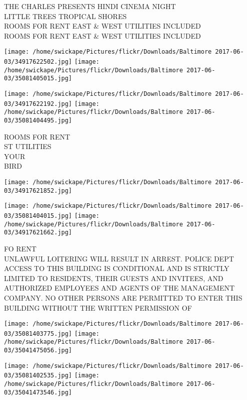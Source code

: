 \documentclass[10pt,letterpaper]{article}
\begin{document}
THE CHARLES PRESENTS HINDI CINEMA NIGHT\\
LITTLE TREES TROPICAL SHORES\\
ROOMS FOR RENT EAST \& WEST UTILITIES INCLUDED\\
ROOMS FOR RENT EAST \& WEST UTILITIES INCLUDED\\
\pagebreak

\texttt{[image: /home/swickape/Pictures/flickr/Downloads/Baltimore 2017-06-03/34917622502.jpg]}
\texttt{[image: /home/swickape/Pictures/flickr/Downloads/Baltimore 2017-06-03/35081405015.jpg]}

\texttt{[image: /home/swickape/Pictures/flickr/Downloads/Baltimore 2017-06-03/34917622192.jpg]}
\texttt{[image: /home/swickape/Pictures/flickr/Downloads/Baltimore 2017-06-03/35081404495.jpg]}

ROOMS FOR RENT\\
ST UTILITIES\\
YOUR\\
BIRD\\
\pagebreak

\texttt{[image: /home/swickape/Pictures/flickr/Downloads/Baltimore 2017-06-03/34917621852.jpg]}

\vspace{0.25in}
\texttt{[image: /home/swickape/Pictures/flickr/Downloads/Baltimore 2017-06-03/35081404015.jpg]}
\texttt{[image: /home/swickape/Pictures/flickr/Downloads/Baltimore 2017-06-03/34917621662.jpg]}

FO RENT\\
UNLAWFUL LOITERING WILL RESULT IN ARREST.  POLICE DEPT\\
ACCESS TO THIS BUILDING IS CONDITIONAL AND IS STRICTLY LIMITED TO RESIDENTS, THEIR GUESTS AND INVITEES, AND AUTHORIZED EMPLOYEES AND AGENTS OF THE MANAGEMENT COMPANY.  NO OTHER PERSONS ARE PERMITTED TO ENTER THIS BUILDING WITHOUT THE WRITTEN PERMISSION OF\\
\pagebreak

\texttt{[image: /home/swickape/Pictures/flickr/Downloads/Baltimore 2017-06-03/35081403775.jpg]}
\texttt{[image: /home/swickape/Pictures/flickr/Downloads/Baltimore 2017-06-03/35041475056.jpg]}

\texttt{[image: /home/swickape/Pictures/flickr/Downloads/Baltimore 2017-06-03/35081402535.jpg]}
\texttt{[image: /home/swickape/Pictures/flickr/Downloads/Baltimore 2017-06-03/35041473546.jpg]}
\end{document}
